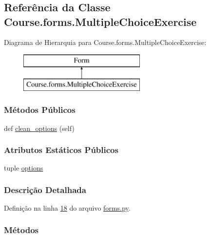 \hypertarget{classCourse_1_1forms_1_1MultipleChoiceExercise}{}\subsection{Referência da Classe Course.\+forms.\+Multiple\+Choice\+Exercise}
\label{classCourse_1_1forms_1_1MultipleChoiceExercise}
Diagrama de Hierarquia para Course.\+forms.\+Multiple\+Choice\+Exercise\+:\begin{figure}[H]
\begin{center}
\leavevmode
\includegraphics[height=2.000000cm]{d7/d12/classCourse_1_1forms_1_1MultipleChoiceExercise}
\end{center}
\end{figure}
\subsubsection*{Métodos Públicos}
\begin{DoxyCompactItemize}
\item 
def \hyperlink{classCourse_1_1forms_1_1MultipleChoiceExercise_afb5041d90dbba78dff5039cd23fec44b}{clean\+\_\+options} (self)
\end{DoxyCompactItemize}
\subsubsection*{Atributos Estáticos Públicos}
\begin{DoxyCompactItemize}
\item 
tuple \hyperlink{classCourse_1_1forms_1_1MultipleChoiceExercise_ade3f98a45467f7f977fb82712df21575}{options}
\end{DoxyCompactItemize}


\subsubsection{Descrição Detalhada}


Definição na linha \hyperlink{Course_2forms_8py_source_l00018}{18} do arquivo \hyperlink{Course_2forms_8py_source}{forms.\+py}.



\subsubsection{Métodos}
\hypertarget{classCourse_1_1forms_1_1MultipleChoiceExercise_afb5041d90dbba78dff5039cd23fec44b}{}
